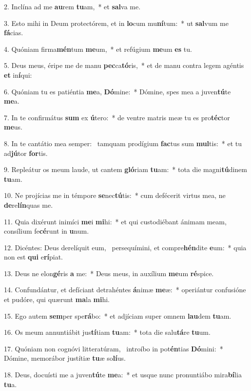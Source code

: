 2. Inclína ad me \textbf{au}rem \textbf{tu}am,~*  et \textbf{sal}va me.\

3. Esto mihi in Deum protectórem, et in \textbf{lo}cum mu\textbf{ní}tum:~*  ut \textbf{sal}vum me \textbf{fá}cias.\

4. Quóniam firma\textbf{mén}tum \textbf{me}um,~*  et refúgium \textbf{me}um \textbf{es} tu.\

5. Deus meus, éripe me de manu \textbf{pec}ca\textbf{tó}ris,~*  et de manu contra legem agéntis \textbf{et} in\textbf{í}qui:\

6. Quóniam tu es patiéntia \textbf{me}a, \textbf{Dó}mine:~*  Dómine, spes mea a juven\textbf{tú}te \textbf{me}a.\

7. In te confirmátus \textbf{sum} ex \textbf{ú}tero:~*  de ventre matris meæ tu es pro\textbf{téc}tor \textbf{me}us.\

8. In te cantátio mea semper: \dag\  tamquam prodígium \textbf{fac}tus sum \textbf{mul}tis:~*  et tu ad\textbf{jú}tor \textbf{for}tis.\

9. Repleátur os meum laude, ut cantem \textbf{gló}riam \textbf{tu}am:~*  tota die magni\textbf{tú}dinem \textbf{tu}am.\

10. Ne projícias me in témpore \textbf{se}nec\textbf{tú}tis:~*  cum defécerit virtus mea, ne \textbf{de}re\textbf{lín}quas me.\

11. Quia dixérunt inimíci \textbf{me}i \textbf{mi}hi:~*  et qui custodiébant ánimam meam, consílium fe\textbf{cé}runt in \textbf{u}num.\

12. Dicéntes: Deus derelíquit eum, \dag\  persequímini, et compre\textbf{hén}dite \textbf{e}um:~*  quia non est \textbf{qui} e\textbf{rí}piat.\

13. Deus ne elon\textbf{gé}ris \textbf{a} me:~*  Deus meus, in auxílium \textbf{me}um \textbf{ré}spice.\

14. Confundántur, et defíciant detrahéntes \textbf{á}nimæ \textbf{me}æ:~*  operiántur confusióne et pudóre, qui quærunt \textbf{ma}la \textbf{mi}hi.\

15. Ego autem \textbf{sem}per spe\textbf{rá}bo:~*  et adjíciam super omnem \textbf{lau}dem \textbf{tu}am.\

16. Os meum annuntiábit jus\textbf{tí}tiam \textbf{tu}am:~*  tota die salu\textbf{tá}re \textbf{tu}um.\

17. Quóniam non cognóvi litteratúram, \dag\  introíbo in pot\textbf{én}tias \textbf{Dó}mini:~*  Dómine, memorábor justítiæ \textbf{tu}æ so\textbf{lí}us.\

18. Deus, docuísti me a juven\textbf{tú}te \textbf{me}a:~*  et usque nunc pronuntiábo mira\textbf{bí}lia \textbf{tu}a.\

